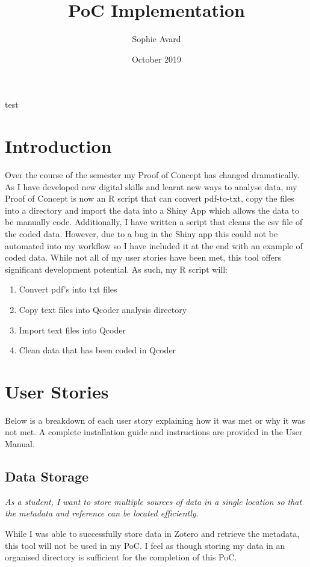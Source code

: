 \documentclass{article}
\title{PoC Implementation}
\author{Sophie Avard }
\date{October 2019}
\begin{document}
\maketitle

test

\section{Introduction}
Over the course of the semester my Proof of Concept has changed dramatically. As I have developed new digital skills and learnt new ways to analyse data, my Proof of Concept is now an R script that can convert pdf-to-txt, copy the files into a directory and import the data into a Shiny App which allows the data to be manually code. Additionally, I have written a script that cleans the csv file of the coded data. However, due to a bug in the Shiny app this could not be automated into my workflow so I have included it at the end with an example of coded data. While not all of my user stories have been met, this tool offers significant development potential. As such, my R script will:
\begin{enumerate}
    \item Convert pdf's into txt files
    \item Copy text files into Qcoder analysis directory 
    \item Import text files into Qcoder 
    \item Clean data that has been coded in Qcoder
\end{enumerate}

\section{User Stories}
Below is a breakdown of each user story explaining how it was met or why it was not met. A complete installation guide and instructions are provided in the User Manual. 

\subsection{Data Storage}
\begin{center}\textit{As a student, I want to store multiple sources of data in a single location so that the metadata and reference can be located efficiently.}
\end{center}
While I was able to successfully store data in Zotero and retrieve the metadata, this tool will not be used in my PoC. I feel as though storing my data in an organised directory is sufficient for the completion of this PoC. 
\end{document}

